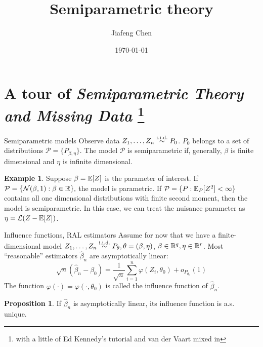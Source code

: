 \documentclass[10pt,aspectratio=169,handout]{beamer}
\title{
Semiparametric theory}
\subtitle{}
\date{\today}
\author{Jiafeng Chen}
\institute{Econometrics Reading Group}
\theoremstyle{definition}
\newtheorem{prop}{Proposition}
\newtheorem{ex}{Example}
\begin{document}
\maketitle

\begin{frame}{}
\hyperlink{sec:applied}{}
\end{frame}

\section{A tour of \emph{Semiparametric Theory and Missing Data}
\footnote{with a little of Ed Kennedy's tutorial and van der Vaart
mixed in}}

\begin{frame}{Semiparametric models}
  Observe data $Z_1,\ldots, Z_n \overset{\mathrm{i.i.d.}}{\sim} P_0$. $P_0$ belongs to a set of
  distributions
  $\mathcal P = \{P_{\beta,\eta}\}$. The model $\mathcal P$ is 
  \alert{semiparametric}  if, generally, $\beta$ is finite dimensional and
  $\eta$ is infinite dimensional.
  
  \begin{ex}
    Suppose $\beta = \mathbb{E}[Z]$ is the parameter of interest. If $\mathcal P =
    \{\mathcal{N}(\beta,1) : \beta \in \mathbb{R}\},$ the model is parametric. If
    $\mathcal P = \{P: \mathbb{E}_P[Z^2] < \infty\}$ contains all one dimensional
    distributions with finite second moment, then the model is
    semiparametric. In this case, we can treat the nuisance parameter as
    $\eta = \mathcal L(Z - \mathbb{E}[Z])$.
  \end{ex}
\end{frame}

\begin{frame}{Influence functions, RAL estimators}
  Assume for now that we have a finite-dimensional model $Z_1,\ldots, Z_n
  \overset{\mathrm{i.i.d.}}{\sim} P_\theta, \theta = (\beta,
  \eta)$, $\beta \in \mathbb{R}^q, \eta \in \mathbb{R}^r$. Most ``reasonable'' estimators
  $\hat \beta_n$
  are \alert{asymptotically linear}: \[
  \sqrt{n}(\hat\beta_n - \beta_0) = \frac{1}{\sqrt{n}} \sum_{i=1}^n \varphi
  (Z_i, \theta_0)+ o_{P_{\theta_0}}(1)
  \]
  The function $\varphi(\cdot) = \varphi(\cdot, \theta_0)$ is called the
  \alert{influence function} of $\hat \beta_n$. 
  \begin{prop}
    If $\hat\beta_n$ is asymptotically linear, its influence function is
    a.s. unique.
  \end{prop}
  
\end{frame}
\end{document}
